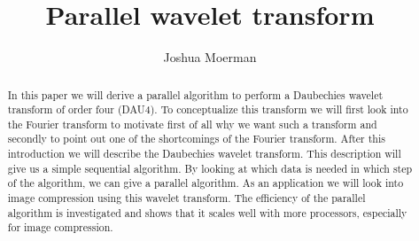 \documentclass[a4paper, 11pt]{amsart}
\title{Parallel wavelet transform}
\author{Joshua Moerman}
\begin{document}
\begin{abstract}
In this paper we will derive a parallel algorithm to perform a Daubechies wavelet transform of order four (DAU4). To conceptualize this transform we will first look into the Fourier transform to motivate first of all why we want such a transform and secondly to point out one of the shortcomings of the Fourier transform. After this introduction we will describe the Daubechies wavelet transform. This  description will give us a simple sequential algorithm. By looking at which data is needed in which step of the algorithm, we can give a parallel algorithm. As an application we will look into image compression using this wavelet transform. The efficiency of the parallel algorithm is investigated and shows that it scales well with more processors, especially for image compression.
\end{abstract}

\maketitle
\tableofcontents











\nocite{*}

{}
\end{document}
